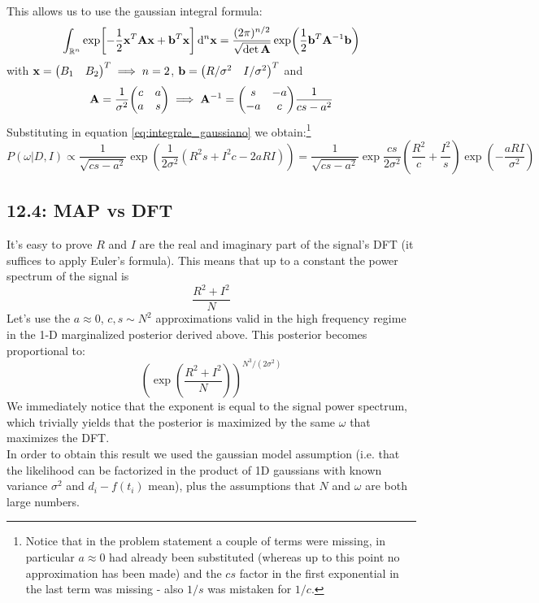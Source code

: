 \documentclass[a4paper]{article}
\newcommand{\R}{\mathbb{R}}
\newcommand{\mat}[1]{\vb{#1}}
\newcommand{\tonde}[1]{\left( {#1} \right)}
\begin{document}
This allows us to use the gaussian integral formula:
\begin{equation}
    \label{eq:integrale_gaussiano}
    \int_{\R^n} \exp[-\frac{1}{2}\vb{x}^T\mat{A}\vb{x} +\vb{b}^T \vb{x}] \dd[n]{\vb{x}} = \frac{(2\pi)^{n/2}}{\sqrt{\det\mat{A}}}\exp(\frac{1}{2}\vb{b}^T \mat{A}^{-1}\vb{b})
\end{equation}
with $\vb{x} = \mqty(B_1 & B_2)^T \implies n=2$, $\vb{b}=\mqty(R/\sigma^2 & I/\sigma^2)^T$ and
\begin{equation*}
    \mat{A} = \frac{1}{\sigma^2} \mqty(c & a \\ a & s) \implies \mat{A}^{-1} = \mqty(s & -a \\ -a & c)\frac{1}{cs - a^2}
\end{equation*}
Substituting in equation \eqref{eq:integrale_gaussiano} we obtain:\footnote{Notice that in the problem statement a couple of terms were missing, in particular $a\approx 0$ had already been substituted (whereas up to this point no approximation has been made) and the $cs$ factor in the first exponential in the last term was missing - also $1/s$ was mistaken for $1/c$.}
\begin{equation*}
    P(\omega|D,I)\propto \frac{1}{\sqrt{cs-a^2}}\exp(\frac{1}{2\sigma^2}\tonde{R^2 s + I^2 c - 2aRI}) = \frac{1}{\sqrt{cs-a^2}}\exp{\frac{cs}{2\sigma^2} \tonde{\frac{R^2}{c} + \frac{I^2}{s}}}\exp(-\frac{aRI}{\sigma^2})
\end{equation*}

\subsection{12.4: MAP vs DFT}
It's easy to prove $R$ and $I$ are the real and imaginary part of the signal's DFT (it suffices to apply Euler's formula). This means that up to a constant the power spectrum of the signal is 
\begin{equation*}
    \frac{R^2+I^2}{N}
\end{equation*}
Let's use the $a\approx 0$, $c,s\sim N^2$ approximations valid in the high frequency regime in the 1-D marginalized posterior derived above. This posterior becomes proportional to:
\begin{equation*}
    \tonde{\exp(\frac{R^2+I^2}{N})}^{N^3/(2\sigma^2)}
\end{equation*}
We immediately notice that the exponent is equal to the signal power spectrum, which trivially yields that the posterior is maximized by the same $\omega$ that maximizes the DFT.\\
In order to obtain this result we used the gaussian model assumption (i.e. that the likelihood can be factorized in the product of 1D gaussians with known variance $\sigma^2$ and $d_i-f(t_i)$ mean), plus the assumptions that $N$ and $\omega$ are both large numbers.
\end{document}
